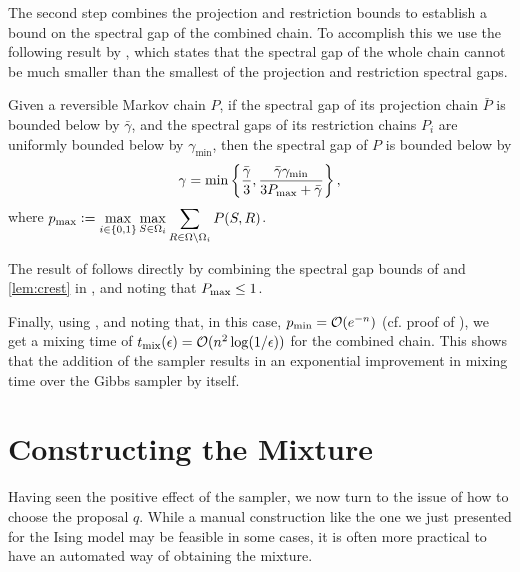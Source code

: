 The second step combines the projection and restriction bounds to establish a bound on the spectral gap of the combined chain.
To accomplish this we use the following result by \cite{jerrum04poincare}, which states that the spectral gap of the whole chain cannot be much smaller than the smallest of the projection and restriction spectral gaps.
\begin{theorem} \label{thm:jerrum04}
  Given a reversible Markov chain $P$, if the spectral gap of its projection chain $\bar{P}$ is bounded below by $\bar{\gamma}$, and the spectral gaps of its restriction chains $P_i$ are uniformly bounded below by $\gamma_{\textrm{min}}$, then the spectral gap of $P$ is bounded below by
  \begin{align*}
    \gamma = \min\left\{ \frac{\bar{\gamma}}{3}, \frac{\bar{\gamma}\gamma_{\textrm{min}}}{3P_{\textrm{max}} + \bar{\gamma}} \right\},
  \end{align*}
  where $p_{\textrm{max}} \vcentcolon= \displaystyle\max_{i \in \{0, 1\}}\max_{S \in \Omega_i} \sum_{R \in \Omega \setminus \Omega_i} P(S, R)$.
\end{theorem}

The result of  follows directly by combining the spectral gap bounds of  and \ref{lem:crest} in , and noting that $P_{\textrm{max}} \leq 1$.

Finally, using , and noting that, in this case, $p_{\textrm{min}} = \mathcal{O}(e^{-n})$ (cf. proof of ), we get a mixing time of $t_{\mathrm{mix}}(\epsilon) = \mathcal{O}(n^2 \log(1 / \epsilon))$ for the combined chain.
This shows that the addition of the \Ms{} sampler results in an exponential improvement in mixing time over the Gibbs sampler by itself.

\section{Constructing the Mixture}
Having seen the positive effect of the \Ms{} sampler, we now turn to the issue of how to choose the proposal $q$.
While a manual construction like the one we just presented for the Ising model may be feasible in some cases, it is often more practical to have an automated way of obtaining the mixture.

